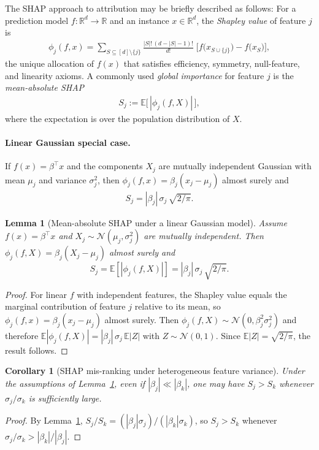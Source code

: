 \documentclass[pdflatex,sn-mathphys-num]{sn-jnl}%
\def\EQSP{3pt}
\newcommand{\cgather}[2][\EQSP]{\begingroup\setlength\abovedisplayskip{#1}\setlength\belowdisplayskip{#1}\begin{gather} #2 \end{gather}\endgroup\noindent}
\theoremstyle{thmstyleone}%
\newtheorem{lemma}[theorem]{Lemma} %
\newtheorem{corollary}[theorem]{Corollary} %
\theoremstyle{thmstyletwo}%
\theoremstyle{thmstylethree}%
\begin{document}
The SHAP approach to attribution may be briefly described as follows: For a prediction model
$f:\mathbb R^{d}\to\mathbb R$ and an instance $x\in\mathbb R^{d}$, the \emph{Shapley value} of feature $j$
is
\cgather{
\phi_{j}(f,x)
=\!\!\sum_{S\subseteq[d]\setminus\{j\}}\!\!
   \frac{|S|!\,(d-|S|-1)!}{d!}\;
   \bigl[f\bigl(x_{S\cup\{j\}}\bigr)-f\bigl(x_{S}\bigr)\bigr],
}
the unique allocation of $f(x)$ that satisfies efficiency, symmetry,
null-feature, and linearity axioms.
A commonly used \emph{global importance} for feature $j$ is the
\emph{mean-absolute SHAP}
\cgather{
S_{j} := \mathbb E\bigl[\,|\phi_{j}(f,X)|\,\bigr],
\label{SHAP-MA}
}
where the expectation is over the population distribution of $X$.

\paragraph{Linear Gaussian special case.}
If $f(x)=\beta^{\top}x$ and the components $X_{j}$ are mutually independent Gaussian with mean $\mu_{j}$ and variance $\sigma_{j}^{2}$,
then $\phi_{j}(f,x)=\beta_{j}(x_{j}-\mu_{j})$ almost surely and
\cgather{
S_{j} = |\beta_{j}|\,\sigma_{j}\,\sqrt{2/\pi}.
\label{SHAP-MA-Lin}
}

\begin{lemma}[Mean-absolute SHAP under a linear Gaussian model]\label{lem:shap_lin_gauss}
Assume $f(x)=\beta^\top x$ and $X_j \sim \mathcal N(\mu_j,\sigma_j^2)$ are mutually independent.
Then $\phi_j(f,X)=\beta_j(X_j-\mu_j)$ almost surely and
\[
S_j = \mathbb E\!\left[|\phi_j(f,X)|\right]
=|\beta_j|\,\sigma_j\,\sqrt{2/\pi}.
\]
\end{lemma}

\begin{proof}
For linear $f$ with independent features, the Shapley value equals the marginal contribution of feature $j$ relative to its mean,
so $\phi_j(f,x)=\beta_j(x_j-\mu_j)$ almost surely.
Then $\phi_j(f,X)\sim \mathcal N(0,\beta_j^2\sigma_j^2)$ and therefore
$\mathbb E|\phi_j(f,X)| = |\beta_j|\,\sigma_j\,\mathbb E|Z|$ with $Z\sim\mathcal N(0,1)$.
Since $\mathbb E|Z|=\sqrt{2/\pi}$, the result follows.
\end{proof}


%
\begin{corollary}[SHAP mis-ranking under heterogeneous feature variance]\label{cor:shap_misrank}
Under the assumptions of Lemma~\ref{lem:shap_lin_gauss}, even if $|\beta_j|\ll|\beta_k|$, one may have $S_j>S_k$
whenever $\sigma_j/\sigma_k$ is sufficiently large.
\end{corollary}
\begin{proof}
By Lemma~\ref{lem:shap_lin_gauss}, $S_j/S_k=(|\beta_j|\sigma_j)/(|\beta_k|\sigma_k)$, so $S_j>S_k$ whenever
$\sigma_j/\sigma_k>|\beta_k|/|\beta_j|$.
\end{proof}
\end{document}
